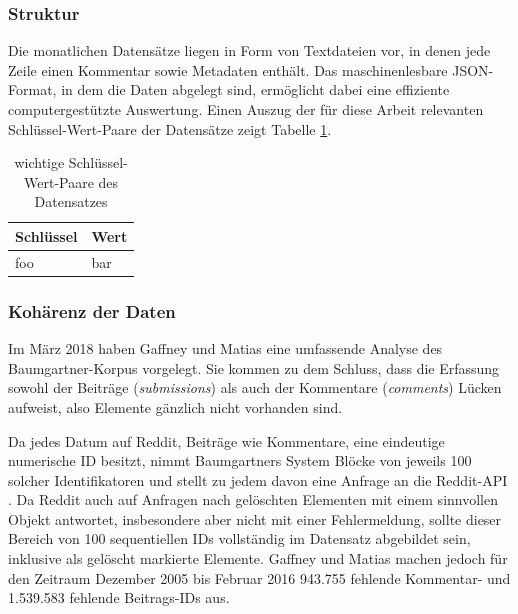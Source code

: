 \documentclass[11pt,a4paper,twoside]{article}
\begin{document}
\hypertarget{struktur}{%
\subsubsection{Struktur}\label{struktur}}

Die monatlichen Datensätze liegen in Form von Textdateien vor, in denen
jede Zeile einen Kommentar sowie Metadaten enthält. Das maschinenlesbare
JSON-Format, in dem die Daten abgelegt sind, ermöglicht dabei eine
effiziente computergestützte Auswertung. Einen Auszug der für diese
Arbeit relevanten Schlüssel-Wert-Paare der Datensätze zeigt Tabelle
\ref{tab:importantkeys}.

\begin{table}

\caption{\label{tab:importantkeys}wichtige Schlüssel-Wert-Paare des Datensatzes}
\centering
\begin{tabular}[t]{ll}
\toprule
Schlüssel & Wert\\
\midrule
foo & bar\\
\bottomrule
\end{tabular}
\end{table}

\hypertarget{koharenz-der-daten}{%
\subsubsection*{Kohärenz der Daten}\label{koharenz-der-daten}}


Im März 2018 haben Gaffney und Matias \autocite{Gaffney2018} eine
umfassende Analyse des Baumgartner-Korpus vorgelegt. Sie kommen zu dem
Schluss, dass die Erfassung sowohl der Beiträge (\emph{submissions}) als
auch der Kommentare (\emph{comments}) Lücken aufweist, also Elemente
gänzlich nicht vorhanden sind.

Da jedes Datum auf Reddit, Beiträge wie Kommentare, eine eindeutige
numerische ID besitzt, nimmt Baumgartners System Blöcke von jeweils 100
solcher Identifikatoren und stellt zu jedem davon eine Anfrage an die
Reddit-API \autocite{Baumgartner2018a}. Da Reddit auch auf Anfragen nach
gelöschten Elementen mit einem sinnvollen Objekt antwortet, insbesondere
aber nicht mit einer Fehlermeldung, sollte dieser Bereich von 100
sequentiellen IDs vollständig im Datensatz abgebildet sein, inklusive
als gelöscht markierte Elemente. Gaffney und Matias machen jedoch für
den Zeitraum Dezember 2005 bis Februar 2016 943.755 fehlende Kommentar-
und 1.539.583 fehlende Beitrags-IDs aus.
\end{document}
